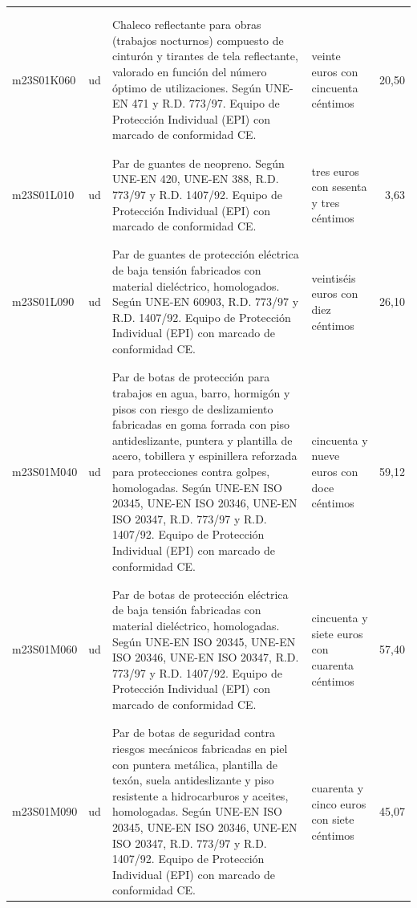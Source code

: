 \documentclass{book}%
\begin{document}
\begin{supertabular}{|l|l|p{5cm}|p{3cm}|r|}
&&&&\\%
&&&&\\%
m23S01K060&ud&Chaleco reflectante para obras (trabajos nocturnos) compuesto de cinturón y tirantes de tela reflectante, valorado en función del número óptimo de utilizaciones. Según UNE{-}EN 471 y R.D. 773/97. Equipo de Protección Individual (EPI) con marcado de conformidad CE.&veinte euros con cincuenta céntimos&20,50\\%
&&&&\\%
&&&&\\%
m23S01L010&ud&Par de guantes de neopreno. Según UNE{-}EN 420, UNE{-}EN 388, R.D. 773/97 y R.D. 1407/92. Equipo de Protección Individual (EPI) con marcado de conformidad CE.&tres euros con sesenta y tres céntimos&3,63\\%
&&&&\\%
&&&&\\%
m23S01L090&ud&Par de guantes de protección eléctrica de baja tensión fabricados con material dieléctrico, homologados. Según UNE{-}EN 60903, R.D. 773/97 y R.D. 1407/92. Equipo de Protección Individual (EPI) con marcado de conformidad CE.&veintiséis euros con diez céntimos&26,10\\%
&&&&\\%
&&&&\\%
m23S01M040&ud&Par de botas de protección para trabajos en agua, barro, hormigón y pisos con riesgo de deslizamiento fabricadas en goma forrada con piso antideslizante, puntera y plantilla de acero, tobillera y espinillera reforzada para protecciones contra golpes, homologadas. Según UNE{-}EN ISO 20345, UNE{-}EN ISO 20346, UNE{-}EN ISO 20347, R.D. 773/97 y R.D. 1407/92. Equipo de Protección Individual (EPI) con marcado de conformidad CE.&cincuenta y nueve euros con doce céntimos&59,12\\%
&&&&\\%
&&&&\\%
m23S01M060&ud&Par de botas de protección eléctrica de baja tensión fabricadas con material dieléctrico, homologadas. Según UNE{-}EN ISO 20345, UNE{-}EN ISO 20346, UNE{-}EN ISO 20347, R.D. 773/97 y R.D. 1407/92. Equipo de Protección Individual (EPI) con marcado de conformidad CE.&cincuenta y siete euros con cuarenta céntimos&57,40\\%
&&&&\\%
&&&&\\%
m23S01M090&ud&Par de botas de seguridad contra riesgos mecánicos fabricadas en piel con puntera metálica, plantilla de texón, suela antideslizante y piso resistente a hidrocarburos y aceites, homologadas. Según UNE{-}EN ISO 20345, UNE{-}EN ISO 20346, UNE{-}EN ISO 20347, R.D. 773/97 y R.D. 1407/92. Equipo de Protección Individual (EPI) con marcado de conformidad CE.&cuarenta y cinco euros con siete céntimos&45,07\\%

\end{supertabular}
\end{document}
